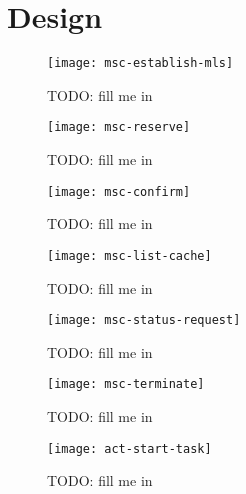 
\chapter{Design}
\label{cha:design}

\begin{figure}
  \begin{center}
    \texttt{[image: msc-establish-mls]}
  \end{center}
  \caption[MSC Message Layer Security]{TODO: fill me in}
  \label{fig:msc-establish-mls}
\end{figure}

\begin{figure}
  \begin{center}
    \texttt{[image: msc-reserve]}
  \end{center}
  \caption[MSC Make Reservation]{TODO: fill me in}
  \label{fig:msc-reserve}
\end{figure}

\begin{figure}
  \begin{center}
    \texttt{[image: msc-confirm]}
  \end{center}
  \caption[MSC Confirm Reservation]{TODO: fill me in}
  \label{fig:msc-confirm}
\end{figure}

\begin{figure}
  \begin{center}
    \texttt{[image: msc-list-cache]}
  \end{center}
  \caption[MSC List Cache Entries]{TODO: fill me in}
  \label{fig:msc-list-cache}
\end{figure}

\begin{figure}
  \begin{center}
    \texttt{[image: msc-status-request]}
  \end{center}
  \caption[MSC Request Task Status]{TODO: fill me in}
  \label{fig:msc-status-request}
\end{figure}

\begin{figure}
  \begin{center}
    \texttt{[image: msc-terminate]}
  \end{center}
  \caption[MSC Terminate Task Request]{TODO: fill me in}
  \label{fig:msc-terminate}
\end{figure}

\begin{figure}
  \begin{center}
    \texttt{[image: act-start-task]}
  \end{center}
  \caption[Start Task Activity]{TODO: fill me in}
  \label{fig:act-start-task}
\end{figure}

